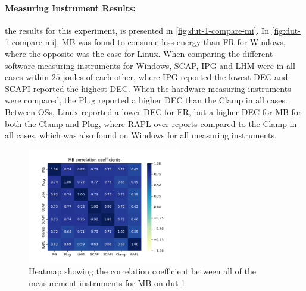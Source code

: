 \paragraph{Measuring Instrument Results:} %
the results for this experiment, is presented in \cref{fig:dut-1-compare-mi}. In \cref{fig:dut-1-compare-mi}, MB was found to consume less energy than FR for Windows, where the opposite was the case for Linux. When comparing the different software measuring instruments for Windows, SCAP, IPG and LHM were in all cases within $25$ joules of each other, where IPG reported the lowest DEC and SCAPI reported the highest DEC. When the hardware measuring instruments were compared, the Plug reported a higher DEC than the Clamp in all cases. Between OSs, Linux reported a lower DEC for FR, but a higher DEC for MB for both the Clamp and Plug, where RAPL over reports compared to the Clamp in all cases, which was also found on Windows for all measuring instruments.






\begin{figure}[H]
    \centering
    \hspace*{-1cm} %
    \includegraphics[width=0.6\textwidth]{figures/MandelbrotDut1.png}
    \caption{Heatmap showing the correlation coefficient between all of the measurement instruments for MB on dut 1}
    \label{fig:mandelCorrDut1}
\end{figure}

